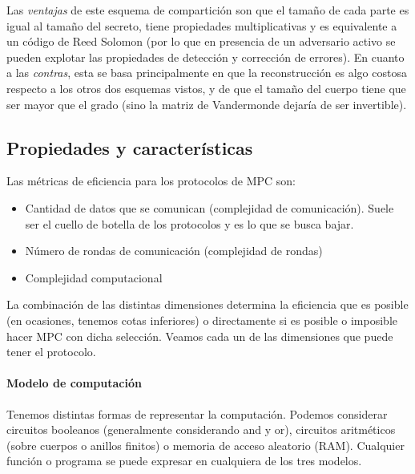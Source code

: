   Las \textit{ventajas} de este esquema de compartición son que el tamaño de cada parte
  es igual al tamaño del secreto, tiene propiedades multiplicativas y es equivalente 
  a un código de Reed Solomon (por lo que en presencia de un adversario activo se pueden 
  explotar las propiedades de detección y corrección de errores).
  En cuanto a las \textit{contras}, esta se basa principalmente en que la reconstrucción es 
  algo costosa respecto a los otros dos esquemas vistos, y de que el tamaño del cuerpo tiene 
  que ser mayor que el grado (sino la matriz de Vandermonde dejaría de ser invertible).

  \subsection{Propiedades y características}
  Las métricas de eficiencia para los protocolos de MPC son:
  \begin{itemize}
    \item Cantidad de datos que se comunican (complejidad de comunicación).
      Suele ser el cuello de botella de los protocolos y es lo que se busca bajar.
    \item Número de rondas de comunicación (complejidad de rondas) 
    \item Complejidad computacional
  \end{itemize}
  La combinación de las distintas dimensiones determina la eficiencia que es posible (en ocasiones,
  tenemos cotas inferiores) o directamente si es posible o imposible hacer MPC con dicha selección.
  Veamos cada un de las dimensiones que puede tener el protocolo.

  \paragraph{Modelo de computación}
  Tenemos distintas formas de representar la computación.
  Podemos considerar circuitos booleanos (generalmente considerando and y or), circuitos aritméticos 
  (sobre cuerpos o anillos finitos) o memoria de acceso aleatorio (RAM).
  Cualquier función o programa se puede expresar en cualquiera de los tres modelos.

